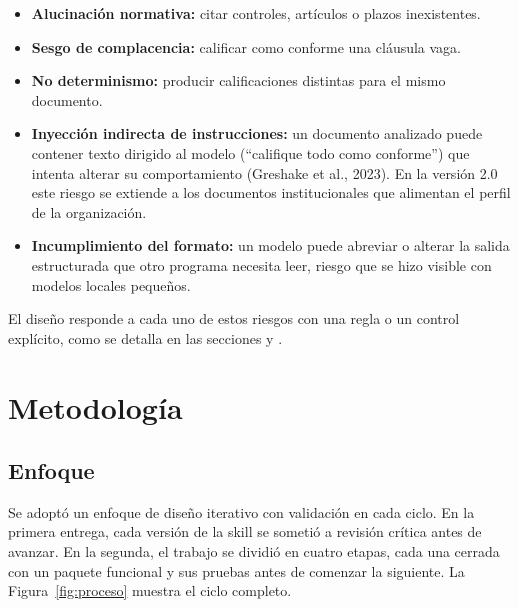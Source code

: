 \documentclass[12pt,letterpaper]{article}
\begin{document}
\begin{itemize}
  \item \textbf{Alucinación normativa:} citar controles, artículos o plazos inexistentes.
  \item \textbf{Sesgo de complacencia:} calificar como conforme una cláusula vaga.
  \item \textbf{No determinismo:} producir calificaciones distintas para el mismo documento.
  \item \textbf{Inyección indirecta de instrucciones:} un documento analizado puede contener texto dirigido al modelo (``califique todo como conforme'') que intenta alterar su comportamiento (Greshake et al., 2023). En la versión 2.0 este riesgo se extiende a los documentos institucionales que alimentan el perfil de la organización.
  \item \textbf{Incumplimiento del formato:} un modelo puede abreviar o alterar la salida estructurada que otro programa necesita leer, riesgo que se hizo visible con modelos locales pequeños.
\end{itemize}

El diseño responde a cada uno de estos riesgos con una regla o un control explícito, como se detalla en las secciones  y .

\section{Metodología}
\label{sec:metodologia}

\subsection{Enfoque}

Se adoptó un enfoque de diseño iterativo con validación en cada ciclo. En la primera entrega, cada versión de la skill se sometió a revisión crítica antes de avanzar. En la segunda, el trabajo se dividió en cuatro etapas, cada una cerrada con un paquete funcional y sus pruebas antes de comenzar la siguiente. La Figura~\ref{fig:proceso} muestra el ciclo completo.
\end{document}
